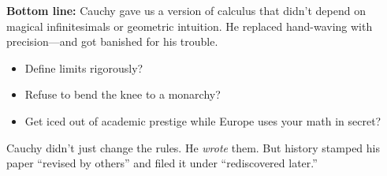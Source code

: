 \textbf{Bottom line:}  
Cauchy gave us a version of calculus that didn’t depend on magical infinitesimals or geometric intuition. He replaced hand-waving with precision—and got banished for his trouble.

\begin{itemize}
  \item Define limits rigorously? \checkmark
  \item Refuse to bend the knee to a monarchy? \checkmark
  \item Get iced out of academic prestige while Europe uses your math in secret? \checkmark\checkmark
\end{itemize}

Cauchy didn’t just change the rules. He \textit{wrote} them. But history stamped his paper “revised by others” and filed it under “rediscovered later.”





